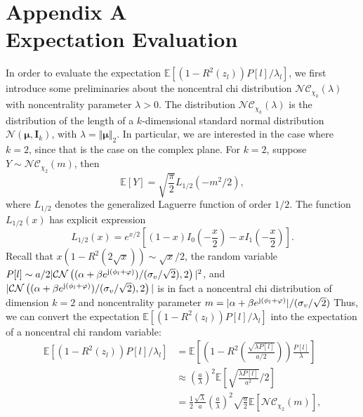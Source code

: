 \documentclass[12pt,draftclsnofoot,journal,onecolumn]{IEEEtran}
\theoremstyle{nonumberplain}
\def \CN {\mathcal{CN}}
\def \nc {\mathcal{NC}}
\begin{document}
\section*{Appendix A\\ Expectation Evaluation}\label{appendix: expectation evaluation}
    In order to evaluate the expectation $\mathbb{E}[(1-R^2(z_l))P[l]/\lambda_l]$, we first introduce some preliminaries about the noncentral chi distribution $\nc_{\chi_k}(\lambda)$ with noncentrality parameter $\lambda>0$. The distribution $\nc_{\chi_k}(\lambda)$ is the distribution of the length of a $k$-dimensional standard normal distribution $\mathcal{N}({\bm \mu}, {\bm I}_k)$, with $\lambda = \Vert {\bm \mu} \Vert_2$. In particular, we are interested in the case where $k=2$, since that is the case on the complex plane. For  $k=2$, suppose $Y \sim \nc_{\chi_2}(m)$, then
    \begin{equation}
        \mathbb{E}\left[Y\right] = \sqrt{\frac{\pi}{2}}L_{1/2}(-m^2/2),
        \label{eqn:noncentral chi mean}
    \end{equation}
    where $L_{1/2}$ denotes the generalized Laguerre function of order $1/2$. The function $L_{1/2}(x)$ has explicit expression 
    \begin{equation}
        L_{1/2}(x) = e^{x/2}\left[(1-x)I_0\left(-\frac{x}{2}\right)-xI_1\left(-\frac{x}{2}\right) \right].
        \label{eqn:Laguerre half order}
    \end{equation}
    Recall that $x(1-R^2(2\sqrt{x})) \sim \sqrt{x}/2$, the random variable $P[l] \sim a/2 \vert \CN\left((\alpha + \beta e^{{\rm j} (\phi_l + \varphi)})/(\sigma_v / \sqrt{2}), 2\right)\vert^2$, and $\vert \CN\left((\alpha + \beta e^{{\rm j} (\phi_l + \varphi)})/(\sigma_v / \sqrt{2}), 2\right)\vert$ is in fact a noncentral chi distribution of dimension $k=2$ and noncentrality parameter $m=\lvert\alpha + \beta e^{{\rm j} (\phi_l + \varphi)}\rvert/(\sigma_v / \sqrt{2})$ Thus, we can convert the expectation  $\mathbb{E}[(1-R^2(z_l))P[l]/\lambda_l]$ into the expectation of a noncentral chi random variable:
    \begin{equation}
        \begin{aligned}
        \mathbb{E}[(1-R^2(z_l))P[l]/\lambda_l] & = \mathbb{E}\left[\left(1-R^2\left(\frac{\sqrt{\lambda P[l]}}{a/2}\right)\right)\frac{P[l]}{\lambda}\right] \\
        & \approx \left(\frac{a}{\lambda}\right)^2 \mathbb{E}\left[ \sqrt{\frac{\lambda P[l]}{a^2}}/2 \right]\\
        & = \frac{1}{2}\frac{\sqrt{\lambda}}{a}\left(\frac{a}{\lambda}\right)^2 \sqrt{\frac{a}{2}}\mathbb{E}\left[\nc_{\chi_2}(m)\right],\\
        \end{aligned}
        \label{eqn:approx evaluation}
    \end{equation}
\end{document}
